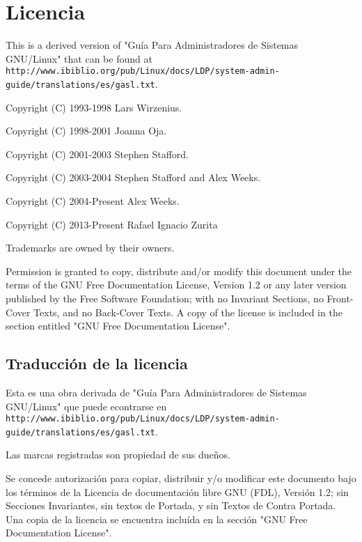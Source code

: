 \section{Licencia}
This is a derived version of "Guía Para Administradores de Sistemas GNU/Linux" that 
can be found at \\ \texttt{http://www.ibiblio.org/pub/Linux/docs/LDP/system-admin-guide/translations/es/gasl.txt}.

Copyright (C) 1993-1998 Lars Wirzenius.

Copyright (C) 1998-2001 Joanna Oja.

Copyright (C) 2001-2003 Stephen Stafford.

Copyright (C) 2003-2004 Stephen Stafford and Alex Weeks.

Copyright (C) 2004-Present Alex Weeks.

Copyright (C) 2013-Present Rafael Ignacio Zurita

Trademarks are owned by their owners.

Permission is granted to copy, distribute and/or modify this document under
the terms of the GNU Free Documentation License, Version 1.2 or any later
version published by the Free Software Foundation; with no Invariant
Sections, no Front-Cover Texts, and no Back-Cover Texts. A copy of the
license is included in the section entitled "GNU Free Documentation License".

\subsection{Traducción de la licencia}
Esta es una obra derivada de "Guía Para Administradores de Sistemas GNU/Linux" que puede 
econtrarse en \\ \texttt{http://www.ibiblio.org/pub/Linux/docs/LDP/system-admin-guide/translations/es/gasl.txt}.

Las marcas registradas son propiedad de sus dueños.

Se concede autorización para copiar, distribuir y/o modificar este documento
bajo los términos de la Licencia de documentación libre GNU (FDL), Versión 1.2; 
sin Secciones Invariantes, sin textos de Portada, y sin Textos de Contra Portada. 
Una copia de la licencia se encuentra incluída en la sección "GNU Free Documentation License".

